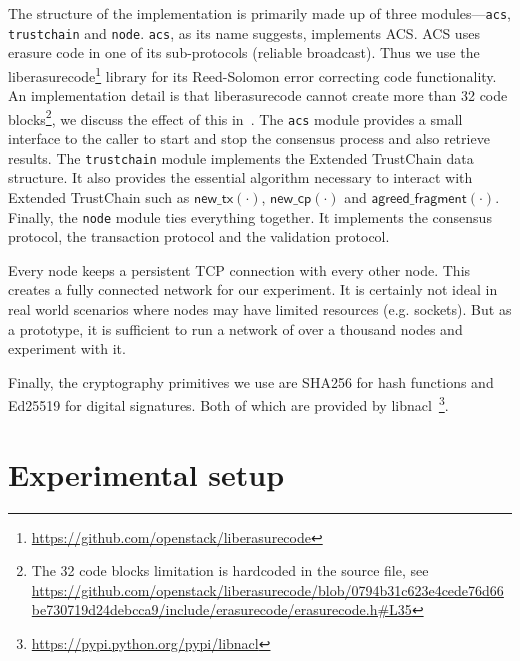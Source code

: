 The structure of the implementation is primarily made up of three modules---\texttt{acs}, \texttt{trustchain} and \texttt{node}.
\texttt{acs}, as its name suggests, implements ACS.
ACS uses erasure code in one of its sub-protocols (reliable broadcast).
Thus we use the liberasurecode\footnote{\url{https://github.com/openstack/liberasurecode}} library for its Reed-Solomon error correcting code functionality.
An implementation detail is that liberasurecode cannot create more than 32 code blocks\footnote{
  The 32 code blocks limitation is hardcoded in the source file, see
  \url{https://github.com/openstack/liberasurecode/blob/0794b31c623e4cede76d66be730719d24debcca9/include/erasurecode/erasurecode.h\#L35}
}, we discuss the effect of this in~.
The \texttt{acs} module provides a small interface to the caller to start and stop the consensus process and also retrieve results.
The \texttt{trustchain} module implements the Extended TrustChain data structure.
It also provides the essential algorithm necessary to interact with Extended TrustChain such as 
$\textsf{new\_tx}(\cdot)$, $\textsf{new\_cp}(\cdot)$ and $\textsf{agreed\_fragment}(\cdot)$.
Finally, the \texttt{node} module ties everything together.
It implements the consensus protocol, the transaction protocol and the validation protocol.


Every node keeps a persistent TCP connection with every other node.
This creates a fully connected network for our experiment.
It is certainly not ideal in real world scenarios where nodes may have limited resources (e.g. sockets).
But as a prototype, it is sufficient to run a network of over a thousand nodes and experiment with it.

Finally, the cryptography primitives we use are SHA256 for hash functions and Ed25519 for digital signatures.
Both of which are provided by libnacl~\footnote{\url{https://pypi.python.org/pypi/libnacl}}.


\section{Experimental setup}
\label{sec:experimental-setup}

